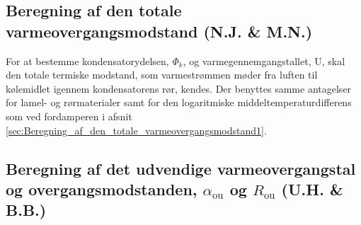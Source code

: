 \documentclass[../Hovedrapport.tex]{subfiles}
\begin{document}



\subsection{Beregning af den totale varmeovergangsmodstand  (N.J. \& M.N.)}
    \label{sec:Beregning_af_den_totale_varmeovergangsmodstand_kondensator}
For at bestemme kondensatorydelsen, $\si{\Phi_k}$, og  varmegennemgangstallet, U, skal den totale termiske modstand, som varmestrømmen møder fra luften til kølemidlet igennem kondensatorens rør, kendes. Der benyttes samme antagelser for lamel- og rørmaterialer samt for den logaritmiske middeltemperaturdifferens som ved fordamperen i afsnit \ref{sec:Beregning_af_den_totale_varmeovergangsmodstand1}.

\subsection{Beregning af det udvendige varmeovergangstal og overgangsmodstanden, $\alpha_\text{ou}$ og $R_\text{ou}$  (U.H. \& B.B.)}
\end{document}
